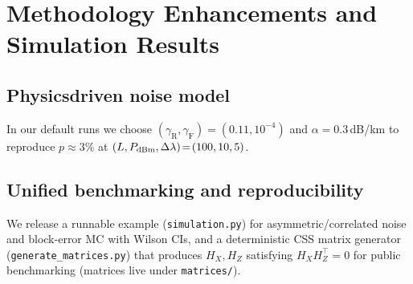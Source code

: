 \documentclass[conference]{IEEEtran}
\begin{document}
\section{Methodology Enhancements and Simulation Results}\label{sec:enhancements}
\subsection{Physics\textendash driven noise model}
In our default runs we choose $(\gamma_{\mathrm{R}},\gamma_{\mathrm{F}})\!=\!(0.11,10^{-4})$ and $\alpha\!=\!0.3$\,dB/km to reproduce $p\!\approx\!3\%$ at $(L,P_{\rm dBm},\Delta\lambda)\!=\!(100,10,5)$.
\subsection{Unified benchmarking and reproducibility}
We release a runnable example (\texttt{simulation.py}) for asymmetric/correlated noise and block-error MC with Wilson CIs, and a deterministic CSS matrix generator (\texttt{generate\_matrices.py}) that produces $H_X,H_Z$ satisfying $H_XH_Z^\top\!=\!0$ for public benchmarking (matrices live under \texttt{matrices/}).




\end{document}
